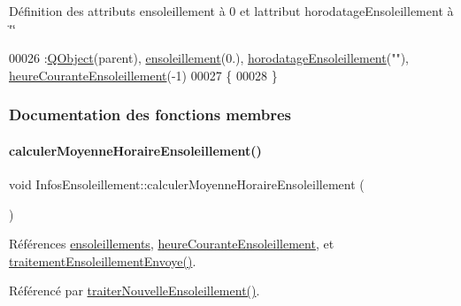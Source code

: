 Définition des attributs ensoleillement à 0 et l\textquotesingle{}attribut horodatage\+Ensoleillement à \char`\"{}\char`\"{} 
\begin{DoxyCode}
00026                                                         :\hyperlink{class_q_object}{QObject}(parent), 
      \hyperlink{class_infos_ensoleillement_a5f3ad64743e3beeb4e64c4555ec6155c}{ensoleillement}(0.), \hyperlink{class_infos_ensoleillement_aa2014f9d13e69e9807543737240dbfd3}{horodatageEnsoleillement}(\textcolor{stringliteral}{""}), 
      \hyperlink{class_infos_ensoleillement_adbf40d147f8a7dbcf5f71b1ac4e0933d}{heureCouranteEnsoleillement}(-1)
00027 \{
00028 \}
\end{DoxyCode}


\subsubsection{Documentation des fonctions membres}
\mbox{\label{class_infos_ensoleillement_a43d0967a59887bf70071296fef0660d3}} 
\paragraph{\texorpdfstring{calculer\+Moyenne\+Horaire\+Ensoleillement()}{calculerMoyenneHoraireEnsoleillement()}}
{\footnotesize\ttfamily void Infos\+Ensoleillement\+::calculer\+Moyenne\+Horaire\+Ensoleillement (\begin{DoxyParamCaption}{ }\end{DoxyParamCaption})\hspace{0.3cm}{\ttfamily [private]}}



Références \hyperlink{class_infos_ensoleillement_a6c3640ed7f3169e6263dc04b0191f478}{ensoleillements}, \hyperlink{class_infos_ensoleillement_adbf40d147f8a7dbcf5f71b1ac4e0933d}{heure\+Courante\+Ensoleillement}, et \hyperlink{class_infos_ensoleillement_a8c0f6c50648ffc4f47f049727e05e8d0}{traitement\+Ensoleillement\+Envoye()}.



Référencé par \hyperlink{class_infos_ensoleillement_abe5426845614e3383e915dc9b3cacc3e}{traiter\+Nouvelle\+Ensoleillement()}.


